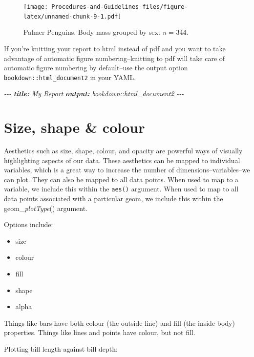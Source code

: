 \documentclass[
]{book}
\newenvironment{Shaded}{\begin{snugshade}}{\end{snugshade}}
\newcommand{\AnnotationTok}[1]{\textcolor[rgb]{0.56,0.35,0.01}{\textbf{\textit{#1}}}}
\newcommand{\CommentTok}[1]{\textcolor[rgb]{0.56,0.35,0.01}{\textit{#1}}}
\providecommand{\tightlist}{%
  \setlength{\itemsep}{0pt}\setlength{\parskip}{0pt}}
\begin{document}
\begin{figure}
\centering
\texttt{[image: Procedures-and-Guidelines\_files/figure-latex/unnamed-chunk-9-1.pdf]}
\caption{\label{fig:unnamed-chunk-9}Palmer Penguins. Body mass grouped by sex. \emph{n} = 344.}
\end{figure}

If you're knitting your report to html instead of pdf and you want to take advantage of automatic figure numbering--knitting to pdf will take care of automatic figure numbering by default--use the output option \texttt{bookdown::html\_document2} in your YAML.

\begin{Shaded}
\begin{Highlighting}[]
\CommentTok{{-}{-}{-}}
\AnnotationTok{title:}\CommentTok{ My Report}
\AnnotationTok{output:}\CommentTok{ bookdown::html\_document2}
\CommentTok{{-}{-}{-}}
\end{Highlighting}
\end{Shaded}

\hypertarget{size-shape-colour}{%
\section{Size, shape \& colour}\label{size-shape-colour}}

Aesthetics such as size, shape, colour, and opacity are powerful ways of visually highlighting aspects of our data. These aesthetics can be mapped to individual variables, which is a great way to increase the number of dimensions--variables--we can plot. They can also be mapped to all data points. When used to map to a variable, we include this within the \texttt{aes()} argument. When used to map to all data points associated with a particular geom, we include this within the geom\_\emph{plotType}() argument.

Options include:

\begin{itemize}
\tightlist
\item
  size
\item
  colour
\item
  fill
\item
  shape
\item
  alpha
\end{itemize}

Things like bars have both colour (the outside line) and fill (the inside body) properties. Things like lines and points have colour, but not fill.

Plotting bill length against bill depth:
\end{document}
